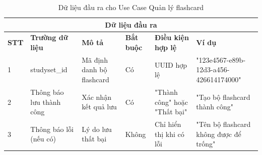 \documentclass[../DoAn.tex]{subfiles}
\begin{document}
\vspace{0.5cm}

\begin{table}[h!]
\centering
\begin{tabular}{|m{1cm}|m{2.5cm}|m{3cm}|m{1cm}|m{2.5cm}|m{3.5cm}|}
    \hline
    \multicolumn{6}{|c|}{\textbf{Dữ liệu đầu ra}} \\
    \hline
    \textbf{STT} & \textbf{Trường dữ liệu} & \textbf{Mô tả} & \textbf{Bắt buộc} & \textbf{Điều kiện hợp lệ} & \textbf{Ví dụ} \\
    \hline
    1 & studyset\_id & Mã định danh bộ flashcard & Có & UUID hợp lệ & "123e4567-e89b-12d3-a456-426614174000" \\
    \hline
    2 & Thông báo lưu thành công & Xác nhận kết quả lưu & Có & "Thành công" hoặc "Thất bại" & "Tạo bộ flashcard thành công" \\
    \hline
    3 & Thông báo lỗi (nếu có) & Lý do lưu thất bại & Không & Chỉ hiển thị khi có lỗi & "Tên bộ flashcard không được để trống" \\
    \hline
\end{tabular}
\caption{Dữ liệu đầu ra cho Use Case Quản lý flashcard}
\end{table}
\end{document}
